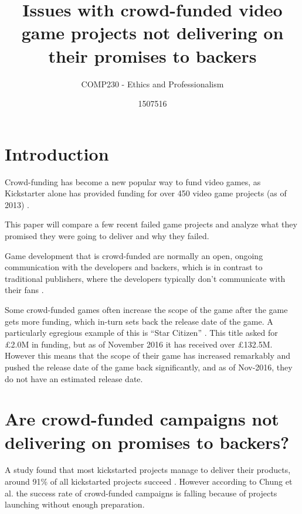 \documentclass{scrartcl}
\title{Issues with crowd-funded video game projects not delivering on their promises to backers} %
\subtitle{COMP230 - Ethics and Professionalism}
\author{1507516}
\begin{document}
\maketitle


\section{Introduction}
Crowd-funding has become a new popular way to fund video games\cite{xu2014show}, as Kickstarter alone has provided funding for over 450 video game projects (as of 2013) \cite{Harris:2013}. %

This paper will compare a few recent failed game projects and analyze what they promised they were going to deliver and why they failed.

Game development that is crowd-funded are normally an open, ongoing communication with the developers and backers, which is in contrast to traditional publishers, where the developers typically don't communicate with their fans \cite{smith2014}.

Some crowd-funded games often increase the scope of the game after the game gets more funding, which in-turn sets back the release date of the game. A particularly egregious example of this is ``Star Citizen'' \cite{kickstarterStarCitizen}. This title asked for \pounds2.0M in funding, but as of November 2016 it has received over \pounds132.5M. However this means that the scope of their game has increased remarkably and pushed the release date of the game back significantly, and as of Nov-2016, they do not have an estimated release date.

\section{Are crowd-funded campaigns not delivering on promises to backers?}

A study found that most kickstarted projects manage to deliver their products, around 91\% of all kickstarted projects succeed \cite{mollick2015}. However according to Chung et al. \cite{Chung:2015} the success rate of crowd-funded campaigns is falling because of projects launching without enough preparation.
\end{document}
